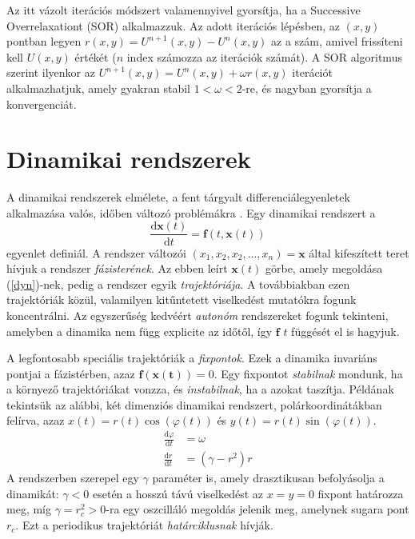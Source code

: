 \documentclass[12pt]{article}
\theoremstyle{plain}
\newcommand{\xvec}{\mathbf{x}}
\begin{document}
Az itt vázolt iterációs módszert valamennyivel gyorsítja, ha a Successive Overrelaxationt (SOR) \cite{landau} alkalmazzuk. Az adott iterációs lépésben, az $(x,y)$ pontban legyen $r(x,y) = U^{n+1}(x,y) - U^{n}(x,y)$ az a szám, amivel frissíteni kell $U(x,y)$ értékét ($n$ index számozza az iterációk számát). A SOR algoritmus szerint ilyenkor az $U^{n+1}(x,y) = U^{n}(x,y) + \omega r(x,y)$ iterációt alkalmazhatjuk, amely gyakran stabil $1<\omega < 2$-re, és nagyban gyorsítja a konvergenciát. 
\section{Dinamikai rendszerek}
A dinamikai rendszerek elmélete, a fent tárgyalt differenciálegyenletek alkalmazása valós, időben változó problémákra \cite{tel, compl}. Egy dinamikai rendszert a 
\begin{equation}
    \label{dyn}
    \frac{\text{d} \xvec(t)}{\text{d}t} = \mathbf{f}(t, \xvec(t)) 
\end{equation}
egyenlet definiál. A rendszer változói $(x_1, x_2, x_2, ..., x_n) = \xvec$ által kifeszített teret hívjuk a rendszer {\em fázisterének}. Az ebben leírt $\xvec(t)$ görbe, amely megoldása (\ref{dyn})-nek, pedig a rendszer egyik {\em trajektóriája}. A továbbiakban ezen trajektóriák közül, valamilyen kitűntetett viselkedést mutatókra fogunk koncentrálni. Az egyszerűség kedvéért {\em autonóm} rendszereket fogunk tekinteni, amelyben a dinamika nem függ explicite az időtől, így $\mathbf{f}$ $t$ függését el is hagyjuk. 

A legfontosabb speciális trajektóriák a {\em fixpontok}. Ezek a dinamika invariáns pontjai a fázistérben, azaz $\mathbf{f(\xvec(t))} = 0$. Egy fixpontot {\em stabilnak} mondunk, ha a környező trajektóriákat vonzza, és {\em instabilnak}, ha a azokat taszítja. 
Példának tekintsük az alábbi, két dimenziós dinamikai rendszert, polárkoordinátákban felírva, azaz $x(t) = r(t)\cos(\varphi(t))$ és $y(t) = r(t)\sin(\varphi(t))$.
\begin{align}
    \label{rot}
    \frac{\text{d} \varphi}{\text{d}t} &= \omega \\
    \frac{\text{d} r}{\text{d}t} &= (\gamma - r^2)r
\end{align}
A rendszerben szerepel egy $\gamma$ paraméter is, amely drasztikusan  befolyásolja a dinamikát: $\gamma < 0$ esetén a hosszú távú viselkedést az $x=y=0$ fixpont határozza meg, míg $\gamma = r_c^2 > 0$-ra egy oszcilláló megoldás jelenik meg, amelynek sugara pont $r_c$. Ezt a periodikus trajektóriát {\em határciklusnak} hívják. 
\end{document}
